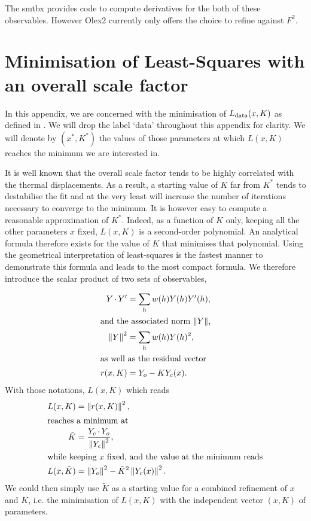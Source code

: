 \documentclass[pdf]{iucr}
\begin{document}
The smtbx provides code to compute derivatives for the both of these observables. However Olex2 currently only offers the choice to refine against $F^2$.

\section{Minimisation of Least-Squares with an overall scale factor}
\label{appendix:leastsquaresminimisation}

In this appendix, we are concerned with the minimisation of $L_{\text{data}}(x, K)$ as defined in . We will drop the label `data' throughout this appendix for clarity. We will denote by $(x^*, K^*)$ the values of those parameters at which $L(x,K)$ reaches the minimum we are interested in.

It is well known that the overall scale factor tends to be highly correlated with the thermal displacements. As a result, a starting value of $K$ far from $K^*$ tends to destabilise the fit and at the very least will increase the number of iterations necessary to converge to the minimum. It is however easy to compute a reasonable approximation of $K^*$. Indeed, as a function of $K$ only, keeping all the other parameters $x$ fixed, $L(x, K)$ is a second-order polynomial. An analytical formula therefore exists for the value of $K$ that minimises that polynomial. Using the geometrical interpretation of least-squares is the fastest manner to demonstrate this formula and leads to the most compact formula. We therefore introduce the scalar product of two sets of observables,

\begin{align}
Y \operatorname{\cdot} Y' &= \sum_h w(h) Y(h) Y'(h), \\
\shortintertext{and the associated norm $\left\| Y \right\|$,}
\left\| Y \right\|^2 &= \sum_h w(h) Y(h)^2, \\
\shortintertext{as well as the residual vector}
r(x, K) &= Y_o - K Y_c(x).
\label{eqn:lsresidualdef}
\end{align}
With those notations, $L(x, K)$ which reads
\begin{align}
L(x, K) &= \left\| r(x, K) \right\|^2, \\
\shortintertext{reaches a minimum at}
\tilde{K} &= \frac{Y_c \operatorname{\cdot} Y_o}{\left\| Y_c \right\|^2},
\label{eqn:tildeK}
\\
\shortintertext{while keeping $x$ fixed, and the value at the minimum reads}
L(x, \tilde{K}) &= \left\| Y_o \right\|^2 - \tilde{K}^2 \left\| Y_c(x) \right\|^2.
\end{align}
We could then simply use $\tilde{K}$ as a starting value for a combined refinement of $x$ and $K$, i.e. the minimisation of $L(x, K)$ with the independent vector $(x, K)$ of parameters.
\end{document}
